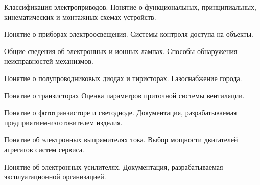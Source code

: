\documentclass[
	14pt,
	a4paper,
	]
	{scrartcl}
\begin{document}
\vfill
\z Классификация электроприводов.
 \vfill
\z Понятие о функциональных, принципиальных, кинематических и монтажных схемах устройств.
 \vfill

\vfill

\newpage


\shapk
{}
\setcounter{zad}{0}

\vfill
\z Понятие о приборах электроосвещения.
 \vfill
\z Системы контроля доступа на объекты.
 \vfill

\vfill

\newpage


\shapk
{}
\setcounter{zad}{0}

\vfill
\z Общие сведения об электронных и ионных лампах.
 \vfill
\z Способы обнаружения неисправностей механизмов.
 \vfill

\vfill

\newpage


\shapk
{}
\setcounter{zad}{0}

\vfill
\z Понятие о полупроводниковых диодах и тиристорах.
 \vfill
\z Газоснабжение города.
 \vfill

\vfill

\newpage


\shapk
{}
\setcounter{zad}{0}

\vfill
\z Понятие о транзисторах
 \vfill
\z Оценка параметров приточной системы вентиляции.
 \vfill

\vfill

\newpage


\shapk
{}
\setcounter{zad}{0}

\vfill
\z Понятие о фототранзисторе и светодиоде.
 \vfill
\z Документация, разрабатываемая предприятием-изготовителем изделия.
 \vfill

\vfill

\newpage


\shapk
{}
\setcounter{zad}{0}

\vfill
\z Понятие об электронных выпрямителях тока.
 \vfill
\z Выбор мощности двигателей агрегатов систем сервиса.
 \vfill

\vfill

\newpage


\shapk
{}
\setcounter{zad}{0}

\vfill
\z Понятие об электронных усилителях.
 \vfill
\z Документация, разрабатываемая эксплуатационной организацией.
 \vfill
\end{document}
